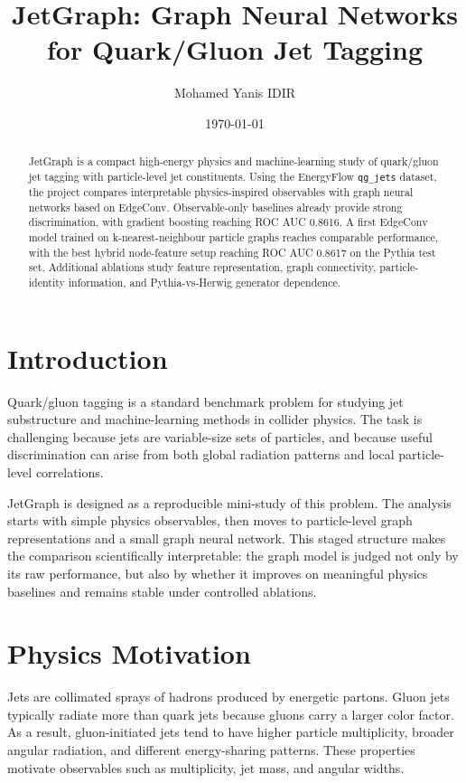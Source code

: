 \documentclass[11pt,a4paper]{article}
\title{\textbf{JetGraph: Graph Neural Networks for Quark/Gluon Jet Tagging}}
\author{Mohamed Yanis IDIR}
\date{\today}
\begin{document}
\maketitle

\begin{abstract}
JetGraph is a compact high-energy physics and machine-learning study of
quark/gluon jet tagging with particle-level jet constituents. Using the
EnergyFlow \texttt{qg\_jets} dataset, the project compares interpretable
physics-inspired observables with graph neural networks based on EdgeConv.
Observable-only baselines already provide strong discrimination, with gradient
boosting reaching ROC AUC 0.8616. A first EdgeConv model trained on
k-nearest-neighbour particle graphs reaches comparable performance, with the
best hybrid node-feature setup reaching ROC AUC 0.8617 on the Pythia test set.
Additional ablations study feature representation, graph connectivity,
particle-identity information, and Pythia-vs-Herwig generator dependence.
\end{abstract}

\section{Introduction}

Quark/gluon tagging is a standard benchmark problem for studying jet
substructure and machine-learning methods in collider physics. The task is
challenging because jets are variable-size sets of particles, and because useful
discrimination can arise from both global radiation patterns and local
particle-level correlations.

JetGraph is designed as a reproducible mini-study of this problem. The analysis
starts with simple physics observables, then moves to particle-level graph
representations and a small graph neural network. This staged structure makes
the comparison scientifically interpretable: the graph model is judged not only
by its raw performance, but also by whether it improves on meaningful physics
baselines and remains stable under controlled ablations.

\section{Physics Motivation}

Jets are collimated sprays of hadrons produced by energetic partons. Gluon jets
typically radiate more than quark jets because gluons carry a larger color
factor. As a result, gluon-initiated jets tend to have higher particle
multiplicity, broader angular radiation, and different energy-sharing patterns.
These properties motivate observables such as multiplicity, jet mass, and
angular widths.
\end{document}
